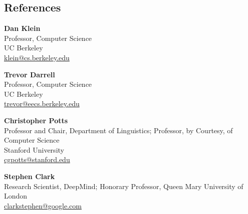 \documentclass[11pt,resmargin,line]{resume}
\newcommand{\mailto}[1]{
  \href{mailto:#1}{#1}
}
\begin{document}
\begin{resume}

\section{References}
\textbf{Dan Klein} \\
Professor, Computer Science \\
UC Berkeley \\
\mailto{klein@cs.berkeley.edu}

\textbf{Trevor Darrell} \\
Professor, Computer Science \\
UC Berkeley \\
\mailto{trevor@eecs.berkeley.edu}

\textbf{Christopher Potts} \\
Professor and Chair, Department of Linguistics; Professor, by Courtesy, of Computer Science \\
Stanford University \\
\mailto{cgpotts@stanford.edu}

\textbf{Stephen Clark} \\
Research Scientist, DeepMind; Honorary Professor, Queen Mary University of London \\
\mailto{clarkstephen@google.com}

\end{resume}
\end{document}
